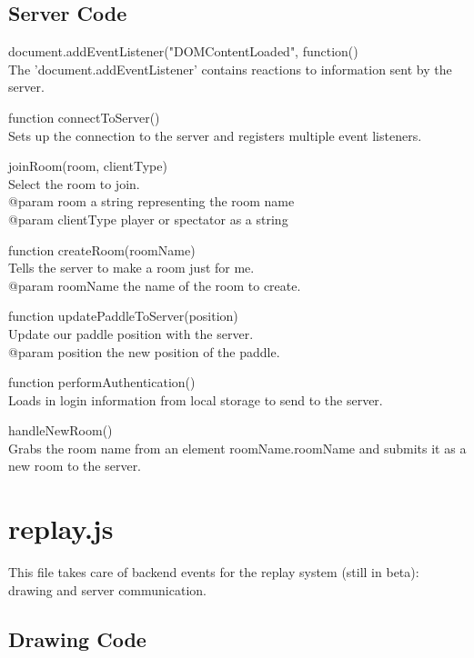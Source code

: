 \documentclass[12pt]{article}
\newenvironment{itemize*}%
  {\begin{itemize}%
  	\setlength{\parsep}{0pt}
    \setlength{\itemsep}{0pt}%
    \setlength{\parskip}{0pt}}%
  {\end{itemize}}
\begin{document}
\subsection{Server Code}
\begin{itemize*}
\item document.addEventListener("DOMContentLoaded", function()\\
The 'document.addEventListener' contains reactions to information sent by the server.
\item function connectToServer()\\
Sets up the connection to the server and registers multiple event listeners.
\item joinRoom(room, clientType)\\
Select the room to join.\\
@param room a string representing the room name\\
@param clientType player or spectator as a string
\item function createRoom(roomName)\\
Tells the server to make a room just for me.\\
@param {roomName} the name of the room to create.
\item function updatePaddleToServer(position)\\
Update our paddle position with the server.\\
@param {position} the new position of the paddle.
\item function performAuthentication()\\
Loads in login information from local storage to send to the server.
\item handleNewRoom()\\
Grabs the room name from an element roomName.roomName and submits it as a new room to the server.
\end{itemize*}


\singlespacing
\section{replay.js}
This file takes care of backend events for the replay system (still in beta):
drawing and server communication.

\subsection{Drawing Code}
\end{document}
